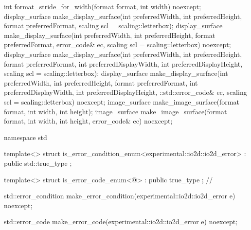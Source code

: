 \begin{codeblock}
{{{{  int format_stride_for_width(format format, int width) noexcept;
  display_surface make_display_surface(int preferredWidth,
    int preferredHeight, format preferredFormat,
    scaling scl = scaling::letterbox);
  display_surface make_display_surface(int preferredWidth,
    int preferredHeight, format preferredFormat, error_code& ec,
    scaling scl = scaling::letterbox) noexcept;
  display_surface make_display_surface(int preferredWidth,
    int preferredHeight, format preferredFormat, int preferredDisplayWidth, 
    int preferredDisplayHeight, scaling scl = scaling::letterbox);
  display_surface make_display_surface(int preferredWidth,
    int preferredHeight, format preferredFormat, int preferredDisplayWidth, 
    int preferredDisplayHeight, ::std::error_code& ec,
    scaling scl = scaling::letterbox) noexcept;
  image_surface make_image_surface(format format, int width, int height);
  image_surface make_image_surface(format format, int width, int height, 
    error_code& ec) noexcept;
} } } }

namespace std {
  template<>
  struct is_error_condition_enum<experimental::io2d::io2d_error>
    : public std::true_type{ };

  template<>
  struct is_error_code_enum<@\impdef@>
    : public true_type{ }; // \expos

  std::error_condition make_error_condition(experimental::io2d::io2d_error e) 
    noexcept;

  std::error_code make_error_code(experimental::io2d::io2d_error e) noexcept;
}

\end{codeblock}
%
